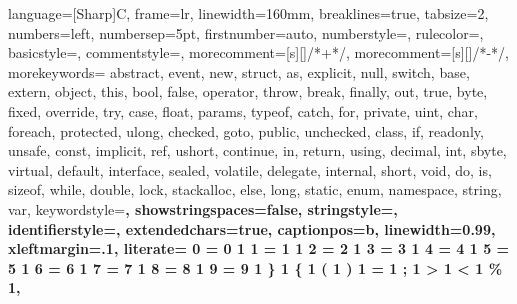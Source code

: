 \usepackage{listings}
\usepackage{etoolbox}




\newcommand\digitstyle{\color{smagenta}}
\newcommand\symbolstyle{\color{base01}}
\makeatletter %
\newcommand{\ProcessDigit}[1]
{%
  \ifnum\lst@mode=\lst@Pmode\relax%
   {\digitstyle #1}%
  \else
    #1%
  \fi
}
\makeatother %

 {
  language=[Sharp]C,
  frame=lr,
  linewidth=160mm,
  breaklines=true,
  tabsize=2,
  numbers=left,
  numbersep=5pt,
  firstnumber=auto,
  numberstyle=\tiny\ttfamily\color{base0},
  rulecolor=\color{base2},
  basicstyle=\footnotesize\ttfamily,
  commentstyle=\color{base01},
  morecomment=[s][\color{base01}]{/*+}{*/},
  morecomment=[s][\color{base01}]{/*-}{*/},
  morekeywords={  abstract, event, new, struct,
                as, explicit, null, switch,
                base, extern, object, this,
                bool, false, operator, throw,
                break, finally, out, true,
                byte, fixed, override, try,
                case, float, params, typeof,
                catch, for, private, uint,
                char, foreach, protected, ulong,
                checked, goto, public, unchecked,
                class, if, readonly, unsafe,
                const, implicit, ref, ushort,
                continue, in, return, using,
                decimal, int, sbyte, virtual,
                default, interface, sealed, volatile,
                delegate, internal, short, void,
                do, is, sizeof, while,
                double, lock, stackalloc,
                else, long, static,
                enum, namespace, string, var},
  keywordstyle=\bfseries\color{sgreen},
  showstringspaces=false,
  stringstyle=\color{scyan},
  identifierstyle=\color{sblue},
  extendedchars=true,
  captionpos=b,
  linewidth=0.99\textwidth,
  xleftmargin=.1\textwidth,
  literate=
    {0}{{\ProcessDigit{0}} }1
    {1}{{\ProcessDigit{1}} }1
    {2}{{\ProcessDigit{2}} }1
    {3}{{\ProcessDigit{3}} }1
    {4}{{\ProcessDigit{4}} }1
    {5}{{\ProcessDigit{5}} }1
    {6}{{\ProcessDigit{6}} }1
    {7}{{\ProcessDigit{7}} }1
    {8}{{\ProcessDigit{8}} }1
    {9}{{\ProcessDigit{9}} }1
    {\}}{{\symbolstyle{\}} } }1
    {\{}{{\symbolstyle{\{}} }1
    {(}{{\symbolstyle{(}} }1
    {)}{{\symbolstyle{)}} }1
    {=}{{\symbolstyle{$=$}} }1
    {;}{{\symbolstyle{$;$}} }1
    {>}{{\symbolstyle{$>$}} }1
    {<}{{\symbolstyle{$<$}} }1
    {\%}{{\symbolstyle{$\%$}} }1,
}

\lstset{escapechar=@,style=solarizedcsharp}
